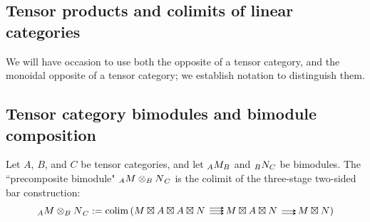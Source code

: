 \documentclass{amsart}
\begin{document}
\subsection{Tensor products and colimits of linear categories} \label{sec-tc-tensorprod}

\begin{definition}
\end{definition}

\begin{definition} \label{def-colim}
\end{definition}


We will have occasion to use both the opposite of a tensor category, and the monoidal opposite of a tensor category; we establish notation to distinguish them.  

\subsection{Tensor category bimodules and bimodule composition} \label{sec-tc-bimod}


\begin{definition}
\end{definition}


\begin{definition}
Let $A$, $B$, and $C$ be tensor categories, and let ${}_{A} {M}_{B}$ and ${}_{B} {N}_{C}$ be bimodules.  The ``precomposite bimodule" ${}_{A} {M \otimes_B N}_{C}$ is the colimit of the three-stage two-sided bar construction:
\begin{equation} \nn
\bimod{A}{M \otimes_B N}{C} := \colim \left( M \dtimes A \dtimes A \dtimes N \righttriplearrows M \dtimes A \dtimes N \rightdoublearrows M \dtimes N \right)
\end{equation}
\end{definition}
\end{document}
